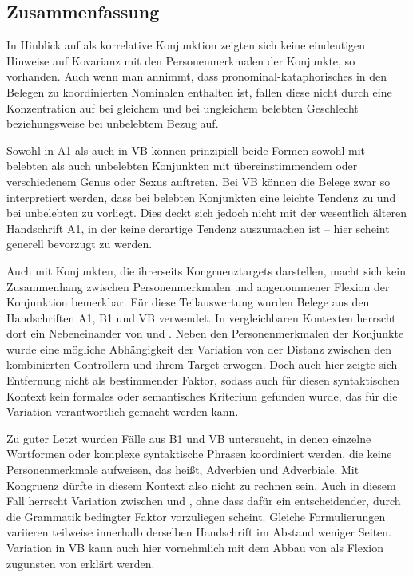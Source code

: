 \subsection{Zusammenfassung}

In Hinblick auf   als
korrelative Konjunktion zeigten sich keine eindeutigen Hinweise auf Kovarianz
mit den Personenmerkmalen der Konjunkte, so vorhanden. Auch wenn man annimmt,
dass pronominal-kataphorisches  in den Belegen zu koordinierten
Nominalen enthalten ist, fallen diese nicht durch eine Konzentration auf
 bei gleichem und  bei ungleichem belebten Geschlecht
beziehungsweise bei unbelebtem Bezug auf.

Sowohl in A1 als auch in VB können prinzipiell beide
Formen sowohl mit belebten als auch unbelebten Konjunkten mit
über\-einstim\-mendem oder verschiedenem Genus oder Sexus auftreten. Bei
VB können die Belege zwar so interpretiert werden, dass bei belebten
Konjunkten eine leichte Tendenz zu  und bei unbelebten zu
 vorliegt. Dies deckt sich jedoch nicht mit der wesentlich älteren
Handschrift A1, in der keine derartige Tendenz auszumachen ist --
hier scheint generell  bevorzugt zu werden.

Auch mit Konjunkten, die ihrerseits Kongruenztargets darstellen, macht sich
kein Zusammen\-hang zwischen Personen\-merkmalen und angenommener Flexion der
Konjunktion bemerkbar. Für diese Teilauswertung wurden Belege aus den
Handschriften A1, B1 und VB verwendet. In
vergleichbaren Kontexten herrscht dort ein Nebeneinander von  und
. Neben den Personenmerkmalen der Konjunkte wurde eine mögliche
Abhängigkeit der Variation von der Distanz zwischen den kombinierten
Controllern und ihrem Target erwogen. Doch auch hier zeigte sich Entfernung
nicht als bestimmender Faktor, sodass auch für diesen syntaktischen Kontext kein
formales oder semantisches Kriterium gefunden wurde, das für die Variation
verantwortlich gemacht werden kann.

Zu guter Letzt wurden Fälle aus B1 und VB untersucht, in
denen einzelne Wortformen oder komplexe syntaktische Phrasen koordiniert werden,
die keine Personenmerkmale aufweisen, das heißt, Adverbien und Adverbiale. Mit
Kongruenz dürfte in diesem Kontext also nicht zu rechnen sein. Auch in diesem
Fall herrscht Variation zwischen  und , ohne dass
dafür ein entscheidender, durch die Grammatik bedingter Faktor vorzuliegen
scheint. Gleiche Formulierungen variieren teilweise innerhalb derselben
Handschrift im Abstand weniger Seiten. Variation in VB kann auch
hier vornehmlich mit dem Abbau von  als Flexion zugunsten von
 erklärt werden.
